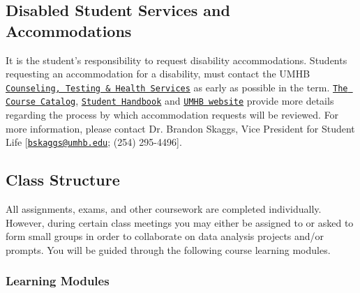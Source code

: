 \documentclass[article]{article}
\begin{document}
\subsection{Disabled Student Services and Accommodations}
It is the student’s responsibility to request disability accommodations. Students requesting an accommodation for a disability, must contact the UMHB \href{http://cths.umhb.edu/disability}{\texttt{Counseling, Testing \& Health Services}} as early as possible in the term. \href{http://catalog.umhb.edu/en/2019-2020/Undergraduate-Catalog}{\texttt{The Course Catalog}}, \href{http://students.umhb.edu/student-handbook}{\texttt{Student Handbook}} and \href{https://go.umhb.edu/}{\texttt{UMHB website}} provide more details regarding the process by which accommodation requests will be reviewed. For more information, please contact Dr. Brandon Skaggs, Vice President for Student Life [\texttt{\href{mailto:bskaggs@umhb.edu}{bskaggs@umhb.edu}}; (254) 295-4496].

\subsection{Class Structure}

All assignments, exams, and other coursework are completed individually. However, during certain class meetings you may either be assigned to or asked to form small groups in order to collaborate on data analysis projects and/or prompts. You will be guided through the following course learning modules.


\subsubsection{Learning Modules}
\end{document}
